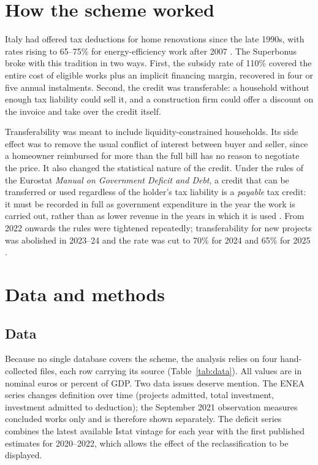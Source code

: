 \documentclass[11pt,a4paper]{article}
\begin{document}
\section{How the scheme worked}
Italy had offered tax deductions for home renovations since the late 1990s, with rates rising to 65--75\% for energy-efficiency work after 2007 \citep{capone2026}. The Superbonus broke with this tradition in two ways. First, the subsidy rate of 110\% covered the entire cost of eligible works plus an implicit financing margin, recovered in four or five annual instalments. Second, the credit was transferable: a household without enough tax liability could sell it, and a construction firm could offer a discount on the invoice and take over the credit itself.

Transferability was meant to include liquidity-constrained households. Its side effect was to remove the usual conflict of interest between buyer and seller, since a homeowner reimbursed for more than the full bill has no reason to negotiate the price. It also changed the statistical nature of the credit. Under the rules of the Eurostat \textit{Manual on Government Deficit and Debt}, a credit that can be transferred or used regardless of the holder's tax liability is a \textit{payable} tax credit: it must be recorded in full as government expenditure in the year the work is carried out, rather than as lower revenue in the years in which it is used \citep{capone2026,istat2023eurostat}. From 2022 onwards the rules were tightened repeatedly; transferability for new projects was abolished in 2023--24 and the rate was cut to 70\% for 2024 and 65\% for 2025 \citep{capone2026}.

\section{Data and methods}
\subsection{Data}
Because no single database covers the scheme, the analysis relies on four hand-collected files, each row carrying its source (Table~\ref{tab:data}). All values are in nominal euros or percent of GDP. Two data issues deserve mention. The ENEA series changes definition over time (projects admitted, total investment, investment admitted to deduction); the September 2021 observation measures concluded works only and is therefore shown separately. The deficit series combines the latest available Istat vintage for each year with the first published estimates for 2020--2022, which allows the effect of the reclassification to be displayed.
\end{document}
